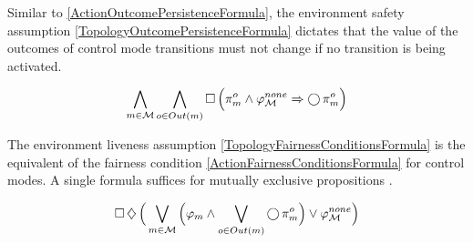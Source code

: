 %

Similar to \eqref{ActionOutcomePersistenceFormula}, the environment safety assumption \eqref{TopologyOutcomePersistenceFormula} dictates that the value of the outcomes of control mode transitions must not change if no transition is being activated.

\begin{equation}\label{TopologyOutcomePersistenceFormula}
	\bigwedge \limits_{m \in \mathcal{M}} \bigwedge \limits_{o \in Out(m)} \operatorname{\Box} \Big( \pi_m^o \wedge \varphi_\mathcal{M}^{none} \Rightarrow \operatorname{\bigcirc} \pi_m^o \Big)
\end{equation}

The environment liveness assumption \eqref{TopologyFairnessConditionsFormula} is the equivalent of the fairness condition \eqref{ActionFairnessConditionsFormula} for control modes.
A single formula suffices for mutually exclusive propositions \cite{Vasu2013ICRA}.


\begin{equation}\label{TopologyFairnessConditionsFormula}
	\operatorname{\Box} \operatorname{\diamondsuit} \Big( \bigvee \limits_{m \in \mathcal{M}} \Big( \varphi_m \wedge \bigvee \limits_{o \in Out(m)} \operatorname{\bigcirc} \pi_m^o \Big) \vee \varphi_\mathcal{M}^{none} \Big)
\end{equation}

